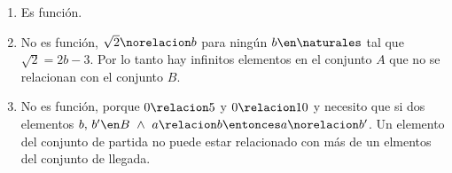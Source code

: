 \begin{enumerate}[label=\roman*)]
  \item Es función.

  \item No es función, $\sqrt{2} \norelacion b$ para ningún $b \en \naturales$ tal que $\sqrt{2} = 2b - 3$. Por lo tanto hay infinitos
        elementos en el conjunto $A$ que no se relacionan con el conjunto $B$.

  \item No es función, porque $0 \relacion 5$ y $0 \relacion 10$ y necesito que si dos elementos $b,\, b' \en B ~\land~ a \relacion b \entonces a \norelacion b'$.
        Un elemento del conjunto de partida no puede estar relacionado con más de un elmentos del conjunto de llegada.
\end{enumerate}
